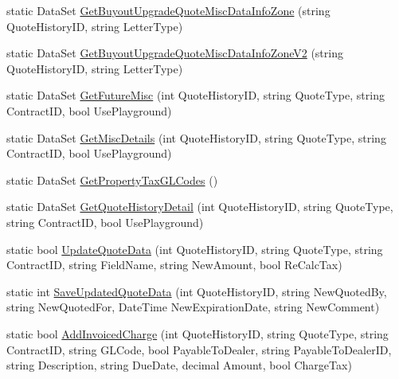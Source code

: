 \begin{DoxyCompactItemize}
\item 
static Data\+Set \mbox{\hyperlink{class_g_f_s_c_1_1_services_1_1_end_of_term_1_1_data_1_1_quote_information_a0e5236ce530e10804702d898444ac9dd}{Get\+Buyout\+Upgrade\+Quote\+Misc\+Data\+Info\+Zone}} (string Quote\+History\+ID, string Letter\+Type)
\item 
static Data\+Set \mbox{\hyperlink{class_g_f_s_c_1_1_services_1_1_end_of_term_1_1_data_1_1_quote_information_ac1d04c2bec1af8d52c09b65c647338fe}{Get\+Buyout\+Upgrade\+Quote\+Misc\+Data\+Info\+Zone\+V2}} (string Quote\+History\+ID, string Letter\+Type)
\item 
static Data\+Set \mbox{\hyperlink{class_g_f_s_c_1_1_services_1_1_end_of_term_1_1_data_1_1_quote_information_adf6c7cd656db3f19ae06c346c3871e45}{Get\+Future\+Misc}} (int Quote\+History\+ID, string Quote\+Type, string Contract\+ID, bool Use\+Playground)
\item 
static Data\+Set \mbox{\hyperlink{class_g_f_s_c_1_1_services_1_1_end_of_term_1_1_data_1_1_quote_information_ae8c9d719072ec83ae5471f24f5836e03}{Get\+Misc\+Details}} (int Quote\+History\+ID, string Quote\+Type, string Contract\+ID, bool Use\+Playground)
\item 
static Data\+Set \mbox{\hyperlink{class_g_f_s_c_1_1_services_1_1_end_of_term_1_1_data_1_1_quote_information_af23e4c60eddc00ad69542519fcff279d}{Get\+Property\+Tax\+G\+L\+Codes}} ()
\item 
static Data\+Set \mbox{\hyperlink{class_g_f_s_c_1_1_services_1_1_end_of_term_1_1_data_1_1_quote_information_a54a941b72cf95985c35e3e47171117d0}{Get\+Quote\+History\+Detail}} (int Quote\+History\+ID, string Quote\+Type, string Contract\+ID, bool Use\+Playground)
\item 
static bool \mbox{\hyperlink{class_g_f_s_c_1_1_services_1_1_end_of_term_1_1_data_1_1_quote_information_a031811de298c7cdd12b7376c6140c086}{Update\+Quote\+Data}} (int Quote\+History\+ID, string Quote\+Type, string Contract\+ID, string Field\+Name, string New\+Amount, bool Re\+Calc\+Tax)
\item 
static int \mbox{\hyperlink{class_g_f_s_c_1_1_services_1_1_end_of_term_1_1_data_1_1_quote_information_a9a349690fc9dd571ea69313d2dff0959}{Save\+Updated\+Quote\+Data}} (int Quote\+History\+ID, string New\+Quoted\+By, string New\+Quoted\+For, Date\+Time New\+Expiration\+Date, string New\+Comment)
\item 
static bool \mbox{\hyperlink{class_g_f_s_c_1_1_services_1_1_end_of_term_1_1_data_1_1_quote_information_ae0868f4beb582bf840844a32099d6fdc}{Add\+Invoiced\+Charge}} (int Quote\+History\+ID, string Quote\+Type, string Contract\+ID, string G\+L\+Code, bool Payable\+To\+Dealer, string Payable\+To\+Dealer\+ID, string Description, string Due\+Date, decimal Amount, bool Charge\+Tax)

\end{DoxyCompactItemize}
